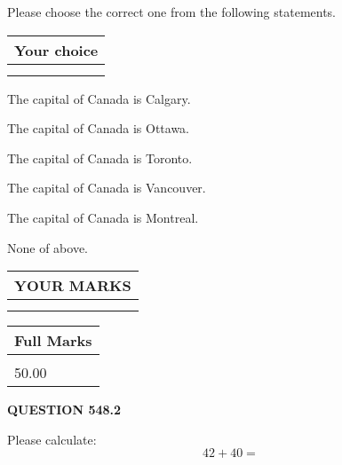\documentclass[12pt]{article}
\begin{document}
  
Please choose the correct one from the following statements.
  
  
\noindent\hspace{3.0in} \begin{tabular}{|l|}
\hline
Your choice \\
\hline
 \\ 
 \\ 
\hline
\end{tabular}
  
  
 
 
The capital of Canada is Calgary.
 
 
The capital of Canada is Ottawa.
 
 
The capital of Canada is Toronto.
 
 
The capital of Canada is Vancouver.
 
 
The capital of Canada is Montreal.
 
 
 None of above.
 
 
  
\vspace{0.2in}
  
\noindent\begin{tabular}{|l|}
\hline
 YOUR MARKS  \\
\hline
 \\ 
 \\ 
\hline
\end{tabular}
\hspace{0.05in} \begin{tabular}{|l|}
\hline
 Full Marks  \\
\hline
 \\ 
50.00 \\
\hline
\end{tabular}
{\textbf{\Large{QUESTION
548.2 
}}}
  
  
 
Please calculate:
\begin{equation}
42 +  %
40 = \nonumber
\end{equation}
 

 

 
   
   
 \vspace{0.2in}
 
   
   
   
   
\end{document}
